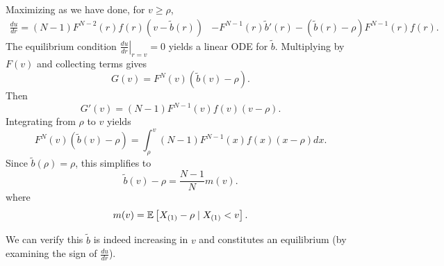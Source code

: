 Maximizing as we have done, for $v \ge \rho$,
\begin{align*}
	\frac{du}{dr}
	= (N-1) F^{N-2}(r) f(r) \left( v- \tilde{b}(r) \right) &- F^{N-1}(r) \tilde{b}'(r) - \left( \tilde{b}(r) - \rho \right)F^{N-1}(r) f(r)
.\end{align*}
The equilibrium condition $\left.\frac{du}{dr}\right|_{r= v} = 0$ yields a linear ODE for $\tilde{b}$.
Multiplying by $F(v)$ and collecting terms gives \[
	G(v) = F^{N}(v) \left( \tilde{b}(v) - \rho \right)
.\]
Then \[
	G'(v) = (N-1) F^{N-1}(v) f(v) (v-\rho)
.\]
Integrating from $\rho$ to $v$ yields \[
	F^N(v) \left( \tilde{b}(v) - \rho \right)
	= \int_{\rho}^{v} (N-1)F^{N-1}(x) f(x) (x-\rho)dx
.\]
Since $\tilde{b}(\rho)=\rho$, this simplifies to \[
	\tilde{b}(v) - \rho = \frac{N-1}{N} m(v)
.\]
where \[
	m(v) = \mathbb{E}\left[X_{(1)} - \rho \mid X_{(1)} < v\right]
.\]

We can verify this $\tilde{b}$ is indeed increasing in $v$ and constitutes an equilibrium (by examining the sign of $\frac{du}{dr}$).
